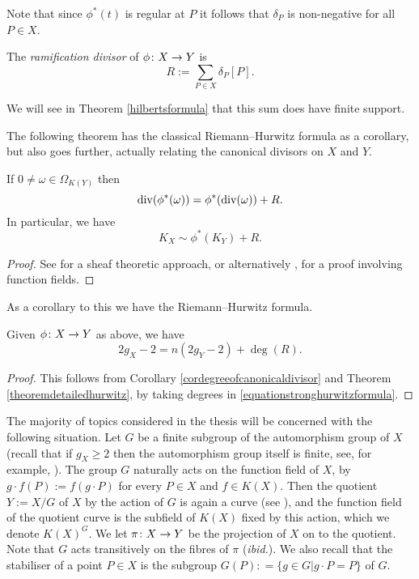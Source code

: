 Note that since $\phi^*(t)$ is regular at $P$ it follows that $\delta_P$ is non-negative for all $P \in X$.
 
    \begin{defn}\label{defnramificationdivisor}
    The \emph{ramification divisor} of $\phi \colon X \rightarrow Y$ is 
        \[
        R:= \sum_{P \in X} \delta_P [P].
        \]
    \end{defn}
We will see in Theorem \ref{hilbertsformula} that this sum does have finite support.

The following theorem has the classical Riemann--Hurwitz formula as a corollary, but also goes further, actually relating the canonical divisors on $X$ and $Y$.
    \begin{thm}\label{theoremdetailedhurwitz}
    If $0 \neq \omega \in \Omega_{K(Y)}$ then
        \begin{equation}\label{equationstronghurwitzformula}
        \operatorname{div}(\phi^*(\omega)) = \phi^*(\operatorname{div}(\omega)) + R.
        \end{equation}
    In particular, we have
        \[
        K_X \sim \phi^*(K_Y) + R.
        \]
    \end{thm}
    \begin{proof}
    See \cite[Chap.\ IV, \S 2, Prop.\ 2.3]{hart} for a sheaf theoretic approach, or alternatively \cite[Thm. 3.4.6]{stichtenoth}, for a proof involving function fields.
    \end{proof}


As a corollary to this we have the Riemann--Hurwitz formula.
    \begin{cor}\label{corhurwitzformula}
    Given $\phi \colon X \rightarrow Y$ as above, we have
        \[
        2g_X - 2 = n(2g_Y -2) + \deg(R).
        \]
    \end{cor}
    \begin{proof}
    This follows from Corollary \ref{cordegreeofcanonicaldivisor} and Theorem \ref{theoremdetailedhurwitz}, by taking degrees in \eqref{equationstronghurwitzformula}.
    \end{proof}

The majority of topics considered in the thesis will be concerned with the following situation.
Let $G$ be a finite subgroup of the automorphism group of $X$ (recall that if $g_X \geq 2$ then the automorphism group itself is finite, see, for example, \cite{finiteautomorphismofcurves}).
The group $G$ naturally acts on the function field of $X$, by $g\cdot f(P) := f(g \cdot P)$ for every $P \in X$ and $f \in K(X)$.
Then the quotient $Y := X/G$ of $X$ by the action of $G$ is again a curve (see \cite[Chap.\ 2, \S 1.7, Ex.\ 8]{pretendshafarevichalggeom1}), and the function field of the quotient curve is the subfield of $K(X)$ fixed by this action, which we denote $K(X)^G$.
We let $\pi \colon X \rightarrow Y$ be the projection of $X$ on to the quotient.
Note that $G$ acts transitively on the fibres of $\pi$ (\textit{ibid.}).
We also recall that the stabiliser of a point $P \in X$ is the subgroup $G(P) : = \{ g \in G | g \cdot P = P\}$ of $G$.


